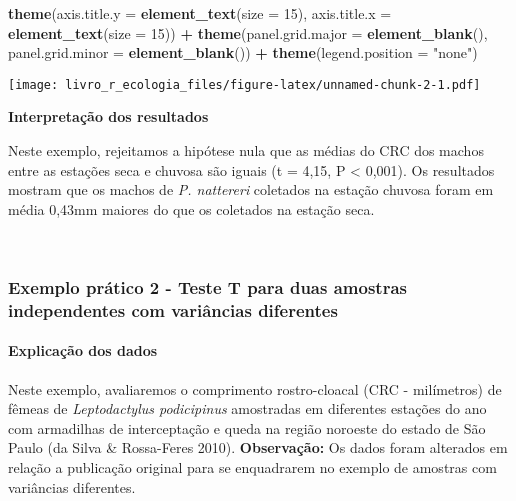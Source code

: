 \documentclass[
]{book}
\newenvironment{Shaded}{\begin{snugshade}}{\end{snugshade}}
\newcommand{\DataTypeTok}[1]{\textcolor[rgb]{0.13,0.29,0.53}{#1}}
\newcommand{\DecValTok}[1]{\textcolor[rgb]{0.00,0.00,0.81}{#1}}
\newcommand{\KeywordTok}[1]{\textcolor[rgb]{0.13,0.29,0.53}{\textbf{#1}}}
\newcommand{\NormalTok}[1]{#1}
\newcommand{\OperatorTok}[1]{\textcolor[rgb]{0.81,0.36,0.00}{\textbf{#1}}}
\newcommand{\StringTok}[1]{\textcolor[rgb]{0.31,0.60,0.02}{#1}}
\begin{document}
\begin{Shaded}
\begin{Highlighting}[]
\StringTok{  }\KeywordTok{theme}\NormalTok{(}\DataTypeTok{axis.title.y =} \KeywordTok{element_text}\NormalTok{(}\DataTypeTok{size =} \DecValTok{15}\NormalTok{), }\DataTypeTok{axis.title.x =} \KeywordTok{element_text}\NormalTok{(}\DataTypeTok{size =} \DecValTok{15}\NormalTok{)) }\OperatorTok{+}
\StringTok{  }\KeywordTok{theme}\NormalTok{(}\DataTypeTok{panel.grid.major =} \KeywordTok{element_blank}\NormalTok{(), }\DataTypeTok{panel.grid.minor =} \KeywordTok{element_blank}\NormalTok{()) }\OperatorTok{+}
\StringTok{  }\KeywordTok{theme}\NormalTok{(}\DataTypeTok{legend.position =} \StringTok{"none"}\NormalTok{)}
\end{Highlighting}
\end{Shaded}

\texttt{[image: livro\_r\_ecologia\_files/figure-latex/unnamed-chunk-2-1.pdf]}

\textbf{Interpretação dos resultados}

Neste exemplo, rejeitamos a hipótese nula que as médias do CRC dos machos entre as estações seca e chuvosa são iguais (t = 4,15, P \textless{} 0,001). Os resultados mostram que os machos de \emph{P. nattereri} coletados na estação chuvosa foram em média 0,43mm maiores do que os coletados na estação seca.

~

\hypertarget{exemplo-pruxe1tico-2---teste-t-para-duas-amostras-independentes-com-variuxe2ncias-diferentes}{%
\subsubsection{Exemplo prático 2 - Teste T para duas amostras independentes com variâncias diferentes}\label{exemplo-pruxe1tico-2---teste-t-para-duas-amostras-independentes-com-variuxe2ncias-diferentes}}

\hypertarget{explicauxe7uxe3o-dos-dados-1}{%
\paragraph{Explicação dos dados}\label{explicauxe7uxe3o-dos-dados-1}}

Neste exemplo, avaliaremos o comprimento rostro-cloacal (CRC - milímetros) de fêmeas de \emph{Leptodactylus podicipinus} amostradas em diferentes estações do ano com armadilhas de interceptação e queda na região noroeste do estado de São Paulo (da Silva \& Rossa-Feres 2010). \textbf{Observação:} Os dados foram alterados em relação a publicação original para se enquadrarem no exemplo de amostras com variâncias diferentes.
\end{document}
